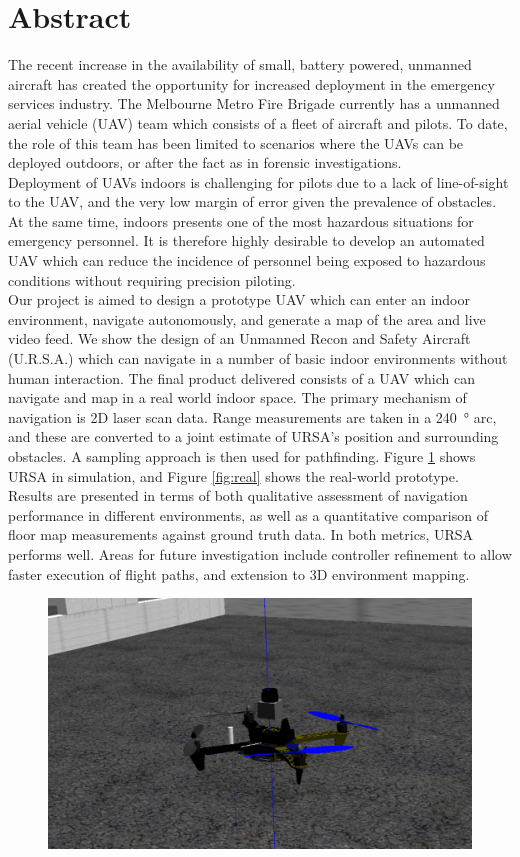 \documentclass[capstone_report.tex]{subfiles}
\begin{document}
\chapter*{Abstract}                                
The recent increase in the availability of small, battery powered, unmanned aircraft has created the opportunity for increased deployment in the emergency services industry. The Melbourne Metro Fire Brigade currently has a unmanned aerial vehicle (UAV) team which consists of a fleet of aircraft and pilots. To date, the role of this team has been limited to scenarios where the UAVs can be deployed outdoors, or after the fact as in forensic investigations.\\

Deployment of UAVs indoors is challenging for pilots due to a lack of line-of-sight to the UAV, and the very low margin of error given the prevalence of obstacles. At the same time, indoors presents one of the most hazardous situations for emergency personnel. It is therefore highly desirable to develop an automated UAV which can reduce the incidence of personnel being exposed to hazardous conditions without requiring precision piloting.\\

Our project is aimed to design a prototype UAV which can enter an indoor environment, navigate autonomously, and generate a map of the area and live video feed. We show the design of an Unmanned Recon and Safety Aircraft (U.R.S.A.) which can navigate in a number of basic indoor environments without human interaction. The final product delivered consists of a UAV which can navigate and map in a real world indoor space. The primary mechanism of navigation is 2D laser scan data. Range measurements are taken in a \SI{240}{\degree} arc, and these are converted to a joint estimate of URSA's position and surrounding obstacles. A sampling approach is then used for pathfinding. Figure \ref{fig:sim} shows URSA in simulation, and Figure \ref{fig:real} shows the real-world prototype.\\ 

Results are presented in terms of both qualitative assessment of navigation performance in different environments, as well as a quantitative comparison of floor map measurements against ground truth data. In both metrics, URSA performs well. Areas for future investigation include controller refinement to allow faster execution of flight paths, and extension to 3D environment mapping.


    \begin{figure}  [H]
	\centering
        \includegraphics[width=0.6\linewidth]{imgs/simulation.png}
        \label{fig:sim}
    \end{figure}
\end{document}
